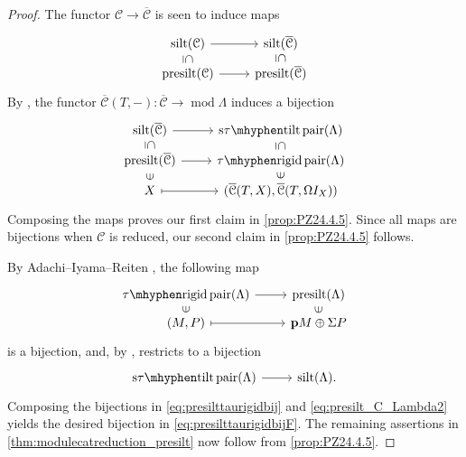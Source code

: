 \documentclass[10pt,twoside, a4paper,reqno]{amsart}
\DeclareMathOperator{\mods}{mod}
\newcommand{\stautiltpair}{\mathrm{s\tau\mhyphen tilt{\,}pair}}
\newcommand{\taurigidpair}{\mathrm{\tau\mhyphen rigid{\,}pair}}
\DeclareMathOperator{\silt}{silt}
\DeclareMathOperator{\presilt}{presilt}
\newcommand{\calC}{\mathcal{C}}
\theoremstyle{definition}
\begin{document}
    \begin{proof}
    The functor $\calC \to \overline{\calC}$ is seen to induce maps 
    \begin{equation*}
    \begin{tikzcd}[row sep=0.5em]
        \silt(\calC)\arrow[d,phantom, sloped, "\subseteq"] \arrow[r] & \silt(\overline{\calC})\arrow[d,phantom, sloped, "\subseteq"] \\
        \presilt(\calC) \arrow[r] & \presilt(\overline{\calC})   
    \end{tikzcd}
    \end{equation*}
    By \cite[{Prop.} 4.5]{PZ24}, the functor $\overline{\calC}(T,-)\colon \overline{\calC} \to \mods{\Lambda}$ induces a bijection 
    \begin{equation*}
    \begin{tikzcd}[row sep=0.5em]
        \silt(\overline{\calC})\arrow[d,phantom, sloped, "\subseteq"] \arrow[r] & \stautiltpair(\Lambda) \arrow[d,phantom, sloped, "\subseteq"] \\
        \presilt(\overline{\calC}) \arrow[r] & \taurigidpair(\Lambda) \\
        X \arrow[r,mapsto] \arrow[u,phantom, sloped, "\in"] & (\overline{\calC}(T,X),\overline{\calC}(T,{\Omega I_X}))\arrow[u,phantom, sloped, "\in"] 
    \end{tikzcd}
    \end{equation*}
    Composing the maps proves our first claim in \eqref{prop:PZ24.4.5}. Since all maps are bijections when $\calC$ is reduced, our second claim in \eqref{prop:PZ24.4.5} follows.

    By Adachi--Iyama--Reiten \cite[Lem. 3.4]{AIR2014}, the following map
     \begin{equation}\label{eq:presilt_C_Lambda2}
    \begin{tikzcd}[row sep=0.5em]
        \taurigidpair(\Lambda) \arrow[r] & \presilt(\Lambda) \\
        (M,P) \arrow[r,mapsto] \arrow[u,phantom, sloped, "\in"] & \mathbf{p}M\oplus {\Sigma P}\arrow[u,phantom, sloped, "\in"] 
    \end{tikzcd}
    \end{equation}
    is a bijection, and, by \cite[Thm. 3.2]{AIR2014}, restricts to a bijection 
    \begin{equation*}
    \begin{tikzcd}[row sep=0.5em]
        \stautiltpair(\Lambda) \arrow[r] & \silt(\Lambda){.}
    \end{tikzcd}
    \end{equation*}
    Composing the bijections in \eqref{eq:presilttaurigidbij} and \eqref{eq:presilt_C_Lambda2} yields the desired bijection in \eqref{eq:presilttaurigidbijF}. The remaining assertions in \eqref{thm:modulecatreduction_presilt} now follow from \eqref{prop:PZ24.4.5}. 
    \end{proof}
\end{document}
